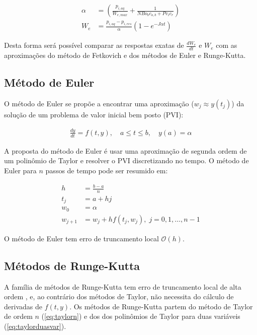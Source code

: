 \documentclass[final,5p]{elsarticle}
\numberwithin{equation}{section}
\begin{document}
        \begin{align}
            \alpha &= \left( \frac{p_{i,aq}}{W_{e,max}} + \frac{1}{N Bo_b c_{o,b} + Pv_i c_r} \right) \nonumber \\
            W_e &= \frac{p_{i,aq} - p_{i,res}}{\alpha} \left( 1- e^{-J \alpha t} \right) \label{eq:wepres}
        \end{align}

        Desta forma será possível comparar as respostas exatas de $\frac{dW_e}{dt}$ e $W_e$ com as aproximações do método de Fetkovich e dos métodos de Euler e Runge-Kutta.

    \subsection{Método de Euler}

        O método de Euler se propõe a encontrar uma aproximação ($w_j \approx y(t_j)$) da solução de um problema de valor inicial bem posto (PVI):

        \begin{align}
            \frac{dy}{dt} = f(t,y), \quad a \leq t \leq b, \quad y(a) = \alpha \label{eq:pvi}
        \end{align}

       A proposta do método de Euler é usar uma aproximação de segunda ordem de um polinômio de Taylor e resolver o PVI discretizando no tempo. O método de Euler para $n$ passos de tempo pode ser resumido em:

        \begin{align}
            h &= \frac{b-a}{n} \nonumber \\
            t_j &= a + h j \nonumber \\
            w_0 &= \alpha \nonumber \\
            w_{j+1} &= w_{j} + h f(t_{j}, w_{j}), \; j=0,1,\ldots,n-1 \label{eq:euler}
        \end{align}

        O método de Euler tem erro de truncamento local $\mathcal{O}(h)$.

    \subsection{Métodos de Runge-Kutta}

        A família de métodos de Runge-Kutta tem erro de truncamento local de alta ordem \cite{burden2016analise}, e, ao contrário dos métodos de Taylor, não necessita do cálculo de derivadas de $f(t,y)$. Os métodos de Runge-Kutta partem do método de Taylor de ordem $n$ (\ref{eq:taylorn}) e dos dos polinômios de Taylor para duas variáveis (\ref{eq:taylorduasvar}).
\end{document}
